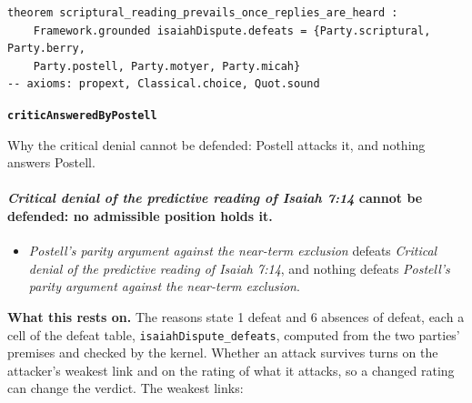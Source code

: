 \documentclass[11pt]{article}
\begin{document}
{\small\begin{verbatim}
theorem scriptural_reading_prevails_once_replies_are_heard :
    Framework.grounded isaiahDispute.defeats = {Party.scriptural, Party.berry,
    Party.postell, Party.motyer, Party.micah}
-- axioms: propext, Classical.choice, Quot.sound
\end{verbatim}}
\par\medskip\noindent\textbf{\texttt{critic\allowbreak{}Answered\allowbreak{}By\allowbreak{}Postell}}\par\nobreak\noindent
Why the critical denial cannot be defended: Postell attacks it, and nothing answers Postell.

\paragraph{\emph{Critical denial of the predictive reading of Isaiah 7:14} cannot be defended: no admissible position holds it.}
\begin{itemize}
\item \emph{Postell's parity argument against the near-term exclusion} defeats \emph{Critical denial of the predictive reading of Isaiah 7:14}, and nothing defeats \emph{Postell's parity argument against the near-term exclusion}.
\end{itemize}
\par\noindent\textbf{What this rests on.} The reasons state 1 defeat and 6 absences of defeat, each a cell of the defeat table, \texttt{isaiah\allowbreak{}Dispute\_\allowbreak{}defeats}, computed from the two parties' premises and checked by the kernel. Whether an attack survives turns on the attacker's weakest link and on the rating of what it attacks, so a changed rating can change the verdict. The weakest links:
\end{document}
